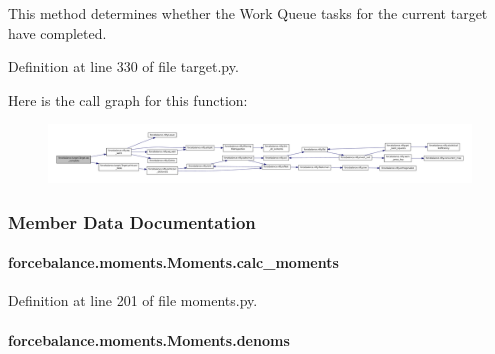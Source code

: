 This method determines whether the Work Queue tasks for the current target have completed. 



Definition at line 330 of file target.\-py.



Here is the call graph for this function\-:\nopagebreak
\begin{figure}[H]
\begin{center}
\leavevmode
\includegraphics[width=350pt]{classforcebalance_1_1target_1_1Target_af6099ec09486213869dba2491bd8ea04_cgraph}
\end{center}
\end{figure}




\subsubsection{Member Data Documentation}
\hypertarget{classforcebalance_1_1moments_1_1Moments_a0b71c05c5ddbea8f0990879abd604aec}{
\paragraph[{calc\-\_\-moments}]{\setlength{\rightskip}{0pt plus 5cm}forcebalance.\-moments.\-Moments.\-calc\-\_\-moments}}\label{classforcebalance_1_1moments_1_1Moments_a0b71c05c5ddbea8f0990879abd604aec}


Definition at line 201 of file moments.\-py.

\hypertarget{classforcebalance_1_1moments_1_1Moments_af8711c91b434e0c8a54a6e4c96e58f3b}{
\paragraph[{denoms}]{\setlength{\rightskip}{0pt plus 5cm}forcebalance.\-moments.\-Moments.\-denoms}}\label{classforcebalance_1_1moments_1_1Moments_af8711c91b434e0c8a54a6e4c96e58f3b}


